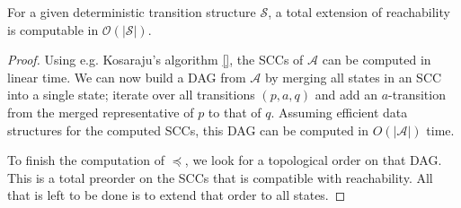 \begin{lem}
	For a given deterministic transition structure $\mathcal{S}$, a total extension of reachability is computable in $\mathcal{O}(|\mathcal{S}|)$.
	\label{lem:general:reach_topo_lintime}
\end{lem}

\begin{proof}
	Using e.g. Kosaraju's algorithm \ref{}, the SCCs of $\mathcal{A}$ can be computed in linear time. We can now build a DAG from $\mathcal{A}$ by merging all states in an SCC into a single state; iterate over all transitions $(p, a, q)$ and add an $a$-transition from the merged representative of $p$ to that of $q$. Assuming efficient data structures for the computed SCCs, this DAG can be computed in $O(|\mathcal{A}|)$ time.
	
	To finish the computation of $\preceq$, we look for a topological order on that DAG. This is a total preorder on the SCCs that is compatible with reachability. All that is left to be done is to extend that order to all states.
\end{proof}


















